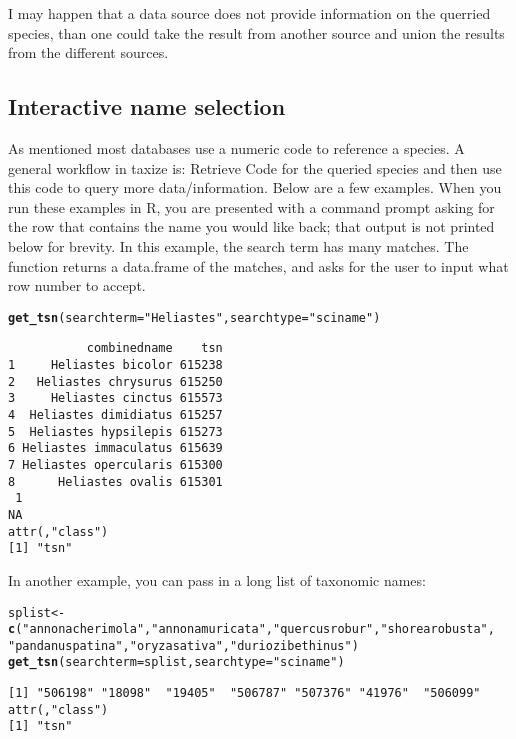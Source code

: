 \documentclass[10pt]{article}\usepackage[]{graphicx}\usepackage[]{color}
\makeatletter
\newcommand{\hlstr}[1]{\textcolor[rgb]{0.192,0.494,0.8}{#1}}%
\newcommand{\hlkwd}[1]{\textcolor[rgb]{0.737,0.353,0.396}{\textbf{#1}}}%
\newenvironment{kframe}{%
 \def\at@end@of@kframe{}%
 \ifinner\ifhmode%
  \def\at@end@of@kframe{\end{minipage}}%
  \begin{minipage}{\columnwidth}%
 \fi\fi%
 \def\FrameCommand##1{\hskip\@totalleftmargin \hskip-\fboxsep
 \colorbox{shadecolor}{##1}\hskip-\fboxsep
     \hskip-\linewidth \hskip-\@totalleftmargin \hskip\columnwidth}%
 \MakeFramed {\advance\hsize-\width
   \@totalleftmargin\z@ \linewidth\hsize
   \@setminipage}}%
 {\par\unskip\endMakeFramed%
 \at@end@of@kframe}
\newenvironment{knitrout}{}{} %
\makeatother
\begin{document}
I may happen that a data source does not provide information on the querried species, than one could take the result from another source and union the results from the different sources.

\subsection*{Interactive name selection}
As mentioned most databases use a numeric code to reference a species. A general workflow in taxize is: Retrieve Code for the queried species and then use this code to query more data/information.
Below are a few examples. When you run these examples in R, you are presented with a command prompt asking for the row that contains the name you would like back; that output is not printed below for brevity. In this example, the search term has many matches. The function returns a data.frame of the matches, and asks for the user to input what row number to accept. 

\begin{knitrout}
\color{fgcolor}\begin{kframe}
\begin{alltt}
\hlkwd{get_tsn}(searchterm = \hlstr{"Heliastes"}, searchtype = \hlstr{"sciname"})
\end{alltt}
\begin{verbatim}
           combinedname    tsn
1     Heliastes bicolor 615238
2   Heliastes chrysurus 615250
3     Heliastes cinctus 615573
4  Heliastes dimidiatus 615257
5  Heliastes hypsilepis 615273
6 Heliastes immaculatus 615639
7 Heliastes opercularis 615300
8      Heliastes ovalis 615301
 1 
NA 
attr(,"class")
[1] "tsn"
\end{verbatim}
\end{kframe}
\end{knitrout}


In another example, you can pass in a long list of taxonomic names:

\begin{knitrout}
\color{fgcolor}\begin{kframe}
\begin{alltt}
splist <- \hlkwd{c}(\hlstr{"annona cherimola"}, \hlstr{"annona muricata"}, \hlstr{"quercus robur"}, \hlstr{"shorea robusta"}, 
    \hlstr{"pandanus patina"}, \hlstr{"oryza sativa"}, \hlstr{"durio zibethinus"})
\hlkwd{get_tsn}(searchterm = splist, searchtype = \hlstr{"sciname"})
\end{alltt}
\begin{verbatim}
[1] "506198" "18098"  "19405"  "506787" "507376" "41976"  "506099"
attr(,"class")
[1] "tsn"
\end{verbatim}
\end{kframe}
\end{knitrout}
\end{document}
